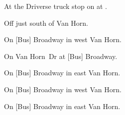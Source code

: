 

\begin{LocationList}

At the Driverse truck stop on  at .

Off  just south of Van Horn.

On [Bus] Broadway in west Van Horn.

On  Van Horn~Dr at [Bus] Broadway.

On [Bus] Broadway in east Van Horn.

On [Bus] Broadway in west Van Horn.

\Location{\TruckService \Service}
On [Bus] Broadway in east Van Horn.

\end{LocationList}
